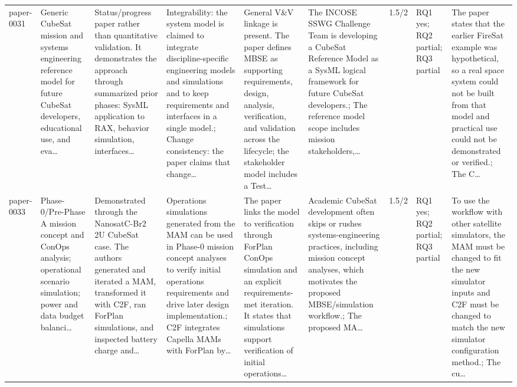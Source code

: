 \documentclass[10pt]{article}
\begin{document}
\begin{landscape}
\begin{longtable}{p{1.0cm}p{2.4cm}p{3.1cm}p{3.7cm}p{3.4cm}p{3.1cm}p{1.0cm}p{1.8cm}p{3.4cm}}
paper-0031 & Generic CubeSat mission and systems engineering reference model for future CubeSat developers, educational use, and eva… & Status/progress paper rather than quantitative validation. It demonstrates the approach through summarized prior phases: SysML application to RAX, behavior simulation, interfaces… & Integrability: the system model is claimed to integrate discipline-specific engineering models and simulations and to keep requirements and interfaces in a single model.; Change consistency: the paper claims that change… & General V\&V linkage is present. The paper defines MBSE as supporting requirements, design, analysis, verification, and validation across the lifecycle; the stakeholder model includes a Test… & The INCOSE SSWG Challenge Team is developing a CubeSat Reference Model as a SysML logical framework for future CubeSat developers.; The reference model scope includes mission stakeholders,… & 1.5/2 & RQ1 yes; RQ2 partial; RQ3 partial & The paper states that the earlier FireSat example was hypothetical, so a real space system could not be built from that model and practical use could not be demonstrated or verified.; The C… \\
paper-0033 & Phase-0/Pre-Phase A mission concept and ConOps analysis; operational scenario simulation; power and data budget balanci… & Demonstrated through the NanosatC-Br2 2U CubeSat case. The authors generated and iterated a MAM, transformed it with C2F, ran ForPlan simulations, and inspected battery charge and… & Operations simulations generated from the MAM can be used in Phase-0 mission concept analyses to verify initial operations requirements and drive later design implementation.; C2F integrates Capella MAMs with ForPlan by… & The paper links the model to verification through ForPlan ConOps simulation and an explicit requirements-met iteration. It states that simulations support verification of initial operations… & Academic CubeSat development often skips or rushes systems-engineering practices, including mission concept analyses, which motivates the proposed MBSE/simulation workflow.; The proposed MA… & 1.5/2 & RQ1 yes; RQ2 partial; RQ3 partial & To use the workflow with other satellite simulators, the MAM must be changed to fit the new simulator inputs and C2F must be changed to match the new simulator configuration method.; The cu… \\

\end{longtable}
\end{landscape}
\end{document}
